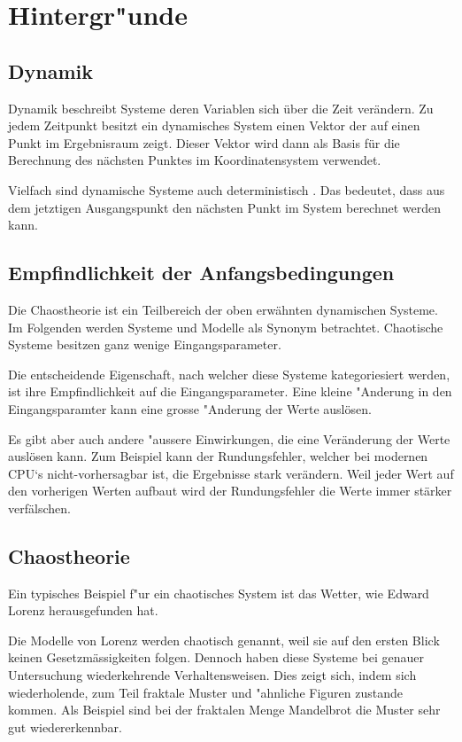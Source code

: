 
\section{Hintergr"unde}

\subsection{Dynamik} %
Dynamik beschreibt Systeme deren Variablen sich über die Zeit verändern. Zu jedem Zeitpunkt besitzt ein dynamisches System einen Vektor der auf einen Punkt im Ergebnisraum zeigt. Dieser Vektor wird dann als Basis für die Berechnung des nächsten Punktes im Koordinatensystem verwendet.

Vielfach sind dynamische Systeme auch deterministisch \cite{wikidynamicalsystems}. Das bedeutet, dass aus dem jetztigen Ausgangspunkt den nächsten Punkt im System berechnet werden kann.


\subsection{Empfindlichkeit der Anfangsbedingungen}
Die Chaostheorie ist ein Teilbereich der oben erwähnten dynamischen Systeme. Im Folgenden werden Systeme und Modelle als Synonym betrachtet. Chaotische Systeme besitzen ganz wenige Eingangsparameter.

Die entscheidende Eigenschaft, nach welcher diese Systeme kategoriesiert werden, ist ihre Empfindlichkeit auf die Eingangsparameter. Eine kleine "Anderung in den Eingangsparamter kann eine grosse "Anderung der Werte auslösen.

Es gibt aber auch andere "aussere Einwirkungen, die eine Veränderung der Werte auslösen kann. Zum Beispiel kann der Rundungsfehler, welcher bei modernen CPU‘s nicht-vorhersagbar ist, die Ergebnisse stark verändern. Weil jeder Wert auf den vorherigen Werten aufbaut wird der Rundungsfehler die Werte immer stärker verfälschen.

\subsection{Chaostheorie}
Ein typisches Beispiel f"ur ein chaotisches System ist das Wetter, wie Edward Lorenz herausgefunden hat. 

Die Modelle von Lorenz werden chaotisch genannt, weil sie auf den ersten Blick keinen Gesetzmässigkeiten folgen. Dennoch haben diese Systeme bei genauer Untersuchung wiederkehrende Verhaltensweisen. Dies zeigt sich, indem sich wiederholende, zum Teil fraktale Muster und "ahnliche Figuren zustande kommen. Als Beispiel sind bei der fraktalen Menge Mandelbrot die Muster sehr gut wiedererkennbar. 


